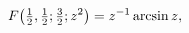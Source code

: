 \[\mathop{F\/}\nolimits\!\left(\tfrac{1}{2},\tfrac{1}{2};\tfrac{3}{2};z^{2}%
\right)=z^{-1}\mathop{\mathrm{arcsin}\/}\nolimits z,\]